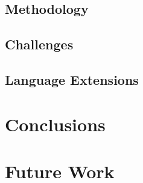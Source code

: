 \documentclass[11pt]{article}
\begin{document}
\subsection*{Methodology}
\subsection*{Challenges}
\subsection*{Language Extensions}
\section*{Conclusions}
\section*{Future Work}
\end{document}
